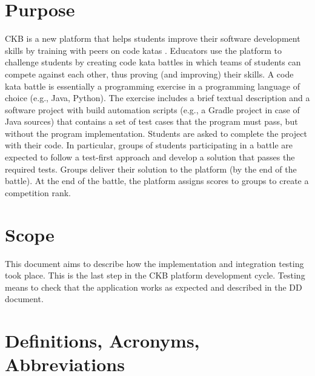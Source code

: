 \section{Purpose}
\ac{CKB} is a new platform that helps students improve their software development skills by training with peers on code katas . Educators use the platform to challenge students by creating code kata battles in which teams of students can compete against each other, thus proving (and improving) their skills.\newline
A code kata battle is essentially a programming exercise in a programming language of choice (e.g., Java, Python). The exercise includes a brief textual description and a software project with build automation scripts (e.g., a Gradle project in case of Java sources) that contains a set of test cases that the program must pass, but without the program implementation. Students are asked to complete the project with their code. In particular, groups of students participating in a battle are expected to follow a test-first approach and develop a solution that passes the required tests. Groups deliver their solution to the platform (by the end of the battle). At the end of the battle, the platform assigns scores to groups to create a competition rank.

\section{Scope}
This document aims to describe how the implementation and integration testing took place.  This is the last step in the \ac{CKB} platform development cycle. Testing means to check that the application works as expected and described in the DD document.

\section{Definitions, Acronyms, Abbreviations}


